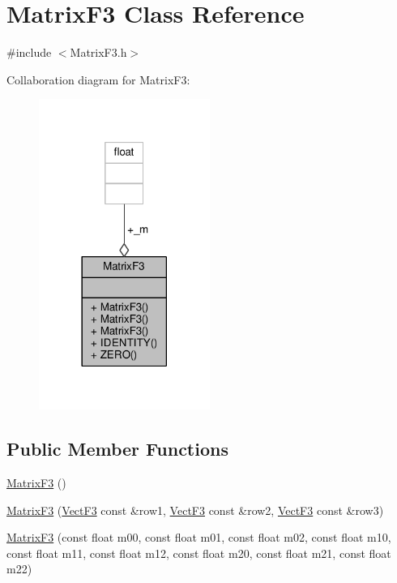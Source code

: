 \hypertarget{classMatrixF3}{\section{Matrix\-F3 Class Reference}
\label{classMatrixF3}
}


{\ttfamily \#include $<$Matrix\-F3.\-h$>$}



Collaboration diagram for Matrix\-F3\-:
\nopagebreak
\begin{figure}[H]
\begin{center}
\leavevmode
\includegraphics[width=158pt]{classMatrixF3__coll__graph}
\end{center}
\end{figure}
\subsection*{Public Member Functions}
\begin{DoxyCompactItemize}
\item 
\hyperlink{classMatrixF3_a9bf84616518690c8c179506fac8f3fdc}{Matrix\-F3} ()
\item 
\hyperlink{classMatrixF3_a24d55903aea4ba1696388169346a71f6}{Matrix\-F3} (\hyperlink{classVectF3}{Vect\-F3} const \&row1, \hyperlink{classVectF3}{Vect\-F3} const \&row2, \hyperlink{classVectF3}{Vect\-F3} const \&row3)
\item 
\hyperlink{classMatrixF3_a03b7c7e08c0464fcc77f3259c1eb4642}{Matrix\-F3} (const float m00, const float m01, const float m02, const float m10, const float m11, const float m12, const float m20, const float m21, const float m22)
\end{DoxyCompactItemize}
